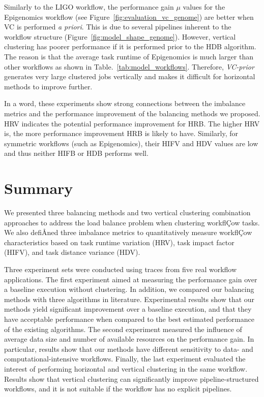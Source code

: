 Similarly to the LIGO workflow, the performance gain $\mu$ values for the Epigenomics workflow (see Figure~\ref{fig:evaluation_vc_genome}) are better when VC is performed \emph{a priori}. This is due to several pipelines inherent to the workflow structure (Figure~\ref{fig:model_shape_genome}). However, vertical clustering has poorer performance if it is performed prior to the HDB algorithm. The reason is that the average task runtime of Epigenomics is much larger than other workflows as shown in Table.~\ref{tab:model_workflows}. Therefore, \emph{VC-prior} generates very large clustered jobs vertically and makes it difficult for horizontal methods to improve further. 


In a word, these experiments show strong connections between the imbalance metrics and the performance improvement of the balancing methods we proposed. HRV indicates the potential performance improvement for HRB. The higher HRV is, the more performance improvement HRB is likely to have. Similarly, for symmetric workflows (such as Epigenomics), their HIFV and HDV values are low and thus neither HIFB or HDB performs well. 




\section{Summary}

We presented three balancing methods and two vertical clustering combination approaches to address the load balance problem when clustering workflÇow tasks. We also defiÅned three imbalance metrics to quantitatively measure workflÇow characteristics based on task runtime variation (HRV), task impact factor (HIFV), and task distance variance (HDV).

Three experiment sets were conducted using traces from five real workflow applications. The first experiment aimed at measuring the performance gain over a baseline execution without clustering. In addition, we compared our balancing methods with three algorithms in literature. Experimental results show that our methods yield significant improvement over a baseline execution, and that they have acceptable performance when compared to the best estimated performance of the existing algorithms. The second experiment measured the influence of average data size and number of available resources on the performance gain. In particular, results show that our methods have different sensitivity to data- and computational-intensive workflows. Finally, the last experiment evaluated the interest of performing horizontal and vertical clustering in the same workflow. Results show that vertical clustering can significantly improve pipeline-structured workflows, and it is not suitable if the workflow has no explicit pipelines.

